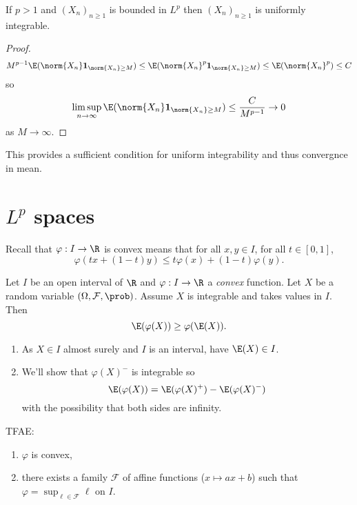 \documentclass[a4paper]{article}
\renewcommand{\P}{\prob} %
\begin{document}
\begin{proposition}
  If \(p > 1\) and \((X_n)_{n \geq 1}\) is bounded in \(L^p\) then \((X_n)_{n \geq 1}\) is uniformly integrable.
\end{proposition}

\begin{proof}
  \[
    M^{p - 1} \E(\norm{X_n} \mathbf 1_{\norm{X_n} \geq M})
    \leq \E(\norm{X_n}^p \mathbf 1_{\norm{X_n} \geq M})
    \leq \E( \norm{X_n}^p) \leq C
  \]
  so
  \[
    \limsup_{n \to \infty} \E(\norm{X_n} \mathbf 1_{\norm{X_n} \geq M}) \leq \frac{C}{M^{p - 1}} \to 0
  \]
  as \(M \to \infty\).
\end{proof}
This provides a sufficient condition for uniform integrability and thus convergnce in mean.

\section{\(L^p\) spaces}

Recall that \(\varphi: I \to \R\) is convex means that for all \(x, y \in I\), for all \(t \in [0, 1]\),
\[
  \varphi(tx + (1 - t) y) \leq t \varphi(x) + (1 - t) \varphi(y).
\]

\begin{proposition}
  \label{prop:Jensen inequality}
  Let \(I\) be an open interval of \(\R\) and \(\varphi: I \to \R\) a \emph{convex} function. Let \(X\) be a random variable \((\Omega, \mathcal F, \P)\). Assume \(X\) is integrable and takes values in \(I\). Then
  \[
    \E(\varphi(X)) \geq \varphi(\E(X)).
  \]
\end{proposition}

\begin{remark}\leavevmode
  \begin{enumerate}
  \item As \(X \in I\) almost surely and \(I\) is an interval, have \(\E(X) \in I\).
  \item We'll show that \(\varphi(X)^-\) is integrable so
    \[
      \E(\varphi(X)) = \E(\varphi(X)^+) - \E(\varphi(X)^-)
    \]
    with the possibility that both sides are infinity.
  \end{enumerate}
\end{remark}

\begin{lemma}
  TFAE:
  \begin{enumerate}
  \item \(\varphi\) is convex,
  \item there exists a family \(\mathcal F\) of affine functions (\(x \mapsto ax + b\)) such that \(\varphi = \sup_{\ell \in \mathcal F} \ell\) on \(I\).
  \end{enumerate}
\end{lemma}
\end{document}
